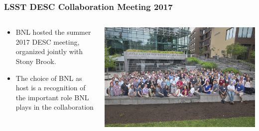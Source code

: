 \documentclass[aspectratio=169]{beamer}
\begin{document}
\begin{frame}
  \frametitle{LSST DESC Collaboration Meeting 2017 }
  
  \begin{columns}
    \begin{column}{0.4\textwidth}
      \begin{itemize}
    \item BNL hosted the summer 2017 DESC meeting, organized jointly
        with Stony Brook.
      \item The choice of BNL as host is a recognition of the important role
          BNL plays in the collaboration

      \end{itemize}
    \end{column}
    \begin{column}{0.6\textwidth}
      \includegraphics[width=\linewidth]{./D0680717.jpg}
    \end{column}
  \end{columns}


\end{frame}

{
\frame
{
}
}
\end{document}
